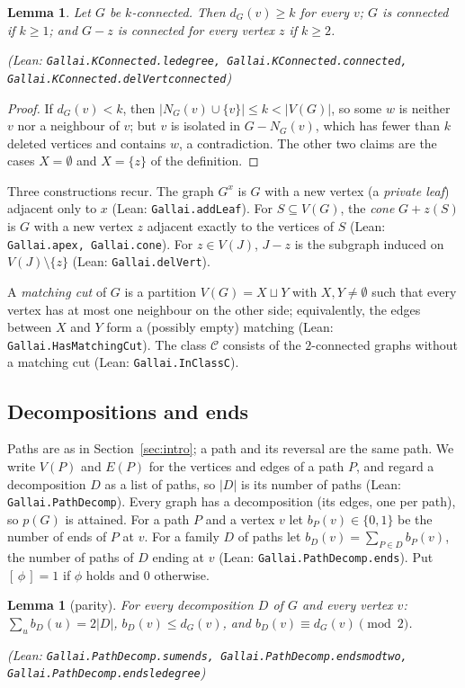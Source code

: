 \documentclass[11pt]{amsart}
\newtheorem{lemma}[theorem]{Lemma}
\theoremstyle{definition}
\theoremstyle{remark}
\renewcommand{\_}{\oldunderscore\allowbreak}
\newcommand{\lean}[1]{\textup{(Lean: {\small\texttt{#1}})}}
\newcommand{\leanst}[1]{\par{\raggedright\small\textup{(Lean: \texttt{#1})}\par}}
\newcommand{\cC}{\mathcal{C}}
\newcommand{\ind}[1]{[\,#1\,]}
\begin{document}
\begin{lemma}\label{lem:kconn}
Let $G$ be $k$-connected. Then $d_G(v)\ge k$ for every $v$; $G$ is connected if $k\ge1$; and
$G-z$ is connected for every vertex $z$ if $k\ge2$.
\leanst{Gallai.KConnected.le\_degree, Gallai.KConnected.connected,
Gallai.KConnected.delVert\_connected}
\end{lemma}

\begin{proof}
If $d_G(v)<k$, then $|N_G(v)\cup\{v\}|\le k<|V(G)|$, so some $w$ is neither $v$ nor a neighbour of
$v$; but $v$ is isolated in $G-N_G(v)$, which has fewer than $k$ deleted vertices and contains $w$, a
contradiction. The other two claims are the cases $X=\emptyset$ and $X=\{z\}$ of the definition.
\end{proof}

Three constructions recur. The graph $G^x$ is $G$ with a new vertex (a \emph{private leaf}) adjacent
only to $x$ \lean{Gallai.addLeaf}. For $S\subseteq V(G)$, the \emph{cone} $G+z(S)$ is $G$ with a new
vertex $z$ adjacent exactly to the vertices of $S$ \lean{Gallai.apex, Gallai.cone}. For
$z\in V(J)$, $J-z$ is the subgraph induced on $V(J)\setminus\{z\}$
\lean{Gallai.delVert}.

A \emph{matching cut} of $G$ is a partition $V(G)=X\sqcup Y$ with $X,Y\ne\emptyset$ such that every
vertex has at most one neighbour on the other side; equivalently, the edges between $X$ and $Y$
form a (possibly empty) matching \lean{Gallai.HasMatchingCut}. The class $\cC$ consists of the
$2$-connected graphs without a matching cut \lean{Gallai.InClassC}.

\subsection{Decompositions and ends}
Paths are as in Section~\ref{sec:intro}; a path and its reversal are the same path. We write $V(P)$
and $E(P)$ for the vertices and edges of a path $P$, and regard a decomposition $D$ as a list of
paths, so $|D|$ is its number of paths \lean{Gallai.PathDecomp}. Every graph has a decomposition
(its edges, one per path), so $p(G)$ is attained. For a path $P$ and a vertex $v$ let
$b_P(v)\in\{0,1\}$ be the number of ends of $P$ at $v$. For a family $D$ of paths let
$b_D(v)=\sum_{P\in D}b_P(v)$, the number of paths of $D$ ending at $v$ \lean{Gallai.PathDecomp.ends}.
Put $\ind{\phi}=1$ if $\phi$ holds and $0$ otherwise.

\begin{lemma}[parity]\label{lem:parity}
For every decomposition $D$ of $G$ and every vertex $v$:
$\sum_{u}b_D(u)=2|D|$, $b_D(v)\le d_G(v)$, and $b_D(v)\equiv d_G(v)\pmod 2$.
\leanst{Gallai.PathDecomp.sum\_ends, Gallai.PathDecomp.ends\_mod\_two,
Gallai.PathDecomp.ends\_le\_degree}
\end{lemma}
\end{document}

